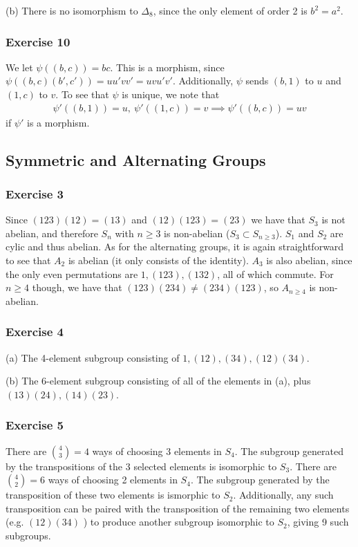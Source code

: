 (b) There is no isomorphism to $\Delta_8$, since the only element of order 2 is $b^2 = a^2$.

\subsubsection{Exercise 10}
We let $\psi((b, c)) = bc$. This is a morphism, since $\psi((b, c)(b', c')) = uu'vv' = uvu'v'$. Additionally,
$\psi$ sends $(b, 1)$ to $u$ and $(1, c)$ to $v$. To see that $\psi$ is unique, we note that
\begin{align*}
        \psi'((b, 1)) = u, \: \psi'((1, c)) = v \implies \psi'((b, c)) = uv
\end{align*}
if $\psi'$ is a morphism. 

\subsection{Symmetric and Alternating Groups}

\subsubsection{Exercise 3}
Since $(1 2 3) (1 2) = (1 3)$ and $(1 2) (1 2 3) = (2 3)$ we have that $S_3$ is not abelian, and therefore 
$S_n$ with $n \geq 3$ is non-abelian ($S_3 \subset S_{n \geq 3}$). $S_1$ and $S_2$ are cylic and thus abelian.
As for the alternating groups, it is again straightforward to see that $A_2$ is abelian (it only consists of
the identity). $A_3$ is also abelian, since the only even permutations are $1, (1 2 3), (1 3 2)$, all of which
commute. For $n \geq 4$ though, we have that $(1 2 3) (2 3 4) \neq (2 3 4) (1 2 3)$, so $A_{n \geq 4}$ is
non-abelian.

\subsubsection{Exercise 4}
(a) The 4-element subgroup consisting of $1, (1 2), (3 4), (1 2) (3 4)$.

(b) The 6-element subgroup consisting of all of the elements in (a), plus \\ $(1 3) (2 4), (1 4) (2 3)$.

\subsubsection{Exercise 5}
There are $\binom{4}{3} = 4$ ways of choosing 3 elements in $S_4$. The subgroup generated by the 
transpositions of the 3 selected elements is isomorphic to $S_3$. 
There are $\binom{4}{2} = 6$ ways of choosing 2 elements in $S_4$. The subgroup generated by the transposition
of these two elements is ismorphic to $S_2$. Additionally, any such transposition can be paired with the
transposition of the remaining two elements (e.g. $(1 2) (3 4)$ ) to produce another subgroup isomorphic to
$S_2$, giving 9 such subgroups.

